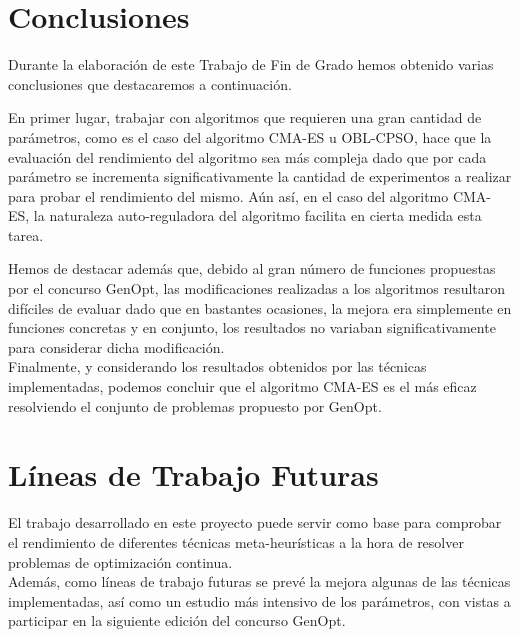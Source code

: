 
\section{Conclusiones}

Durante la elaboración de este Trabajo de Fin de Grado hemos obtenido varias conclusiones que destacaremos a continuación.

En primer lugar, trabajar con algoritmos que requieren una gran cantidad de parámetros, como es el caso del algoritmo CMA-ES u OBL-CPSO, hace que la evaluación del rendimiento del algoritmo sea más compleja dado que por cada parámetro se incrementa significativamente la cantidad de experimentos a realizar para probar el rendimiento del mismo. Aún así, en el caso del algoritmo CMA-ES, la naturaleza auto-reguladora del algoritmo facilita en cierta medida esta tarea. 

Hemos de destacar además que, debido al gran número de funciones propuestas por el concurso GenOpt, las modificaciones realizadas a los algoritmos resultaron difíciles de evaluar dado que en bastantes ocasiones, la mejora era simplemente en funciones concretas y en conjunto, los resultados no variaban significativamente para considerar dicha modificación.\\

Finalmente, y considerando los resultados obtenidos por las técnicas implementadas, podemos concluir que el algoritmo CMA-ES es el más eficaz resolviendo el conjunto de problemas propuesto por GenOpt.


\section{Líneas de Trabajo Futuras}

El trabajo desarrollado en este proyecto puede servir como base para comprobar el rendimiento de diferentes técnicas meta-heurísticas a la hora de resolver problemas de optimización continua. \\
Además, como líneas de trabajo futuras se prevé la mejora algunas de las técnicas implementadas, así como un estudio más intensivo de los parámetros, con vistas a participar en la siguiente edición del concurso GenOpt.